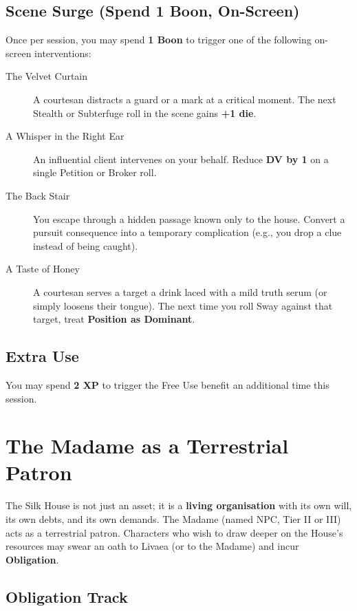 \documentclass[10pt,twoside]{book}
\begin{document}
\subsection{Scene Surge (Spend 1 Boon, On-Screen)}

Once per session, you may spend \textbf{1 Boon} to trigger one of the following on-screen interventions:

\begin{description}
  \item[The Velvet Curtain] A courtesan distracts a guard or a mark at a critical moment. The next Stealth or Subterfuge roll in the scene gains \textbf{+1 die}.

  \item[A Whisper in the Right Ear] An influential client intervenes on your behalf. Reduce \textbf{DV by 1} on a single Petition or Broker roll.

  \item[The Back Stair] You escape through a hidden passage known only to the house. Convert a pursuit consequence into a temporary complication (e.g., you drop a clue instead of being caught).

  \item[A Taste of Honey] A courtesan serves a target a drink laced with a mild truth serum (or simply loosens their tongue). The next time you roll Sway against that target, treat \textbf{Position as Dominant}.
\end{description}

\subsection{Extra Use}

You may spend \textbf{2 XP} to trigger the Free Use benefit an additional time this session.

\section{The Madame as a Terrestrial Patron}

The Silk House is not just an asset; it is a \textbf{living organisation} with its own will, its own debts, and its own demands. The Madame (named NPC, Tier II or III) acts as a terrestrial patron. Characters who wish to draw deeper on the House's resources may swear an oath to Livaea (or to the Madame) and incur \textbf{Obligation}.

\subsection{Obligation Track}
\end{document}
